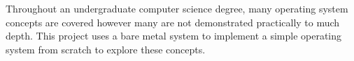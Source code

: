 
Throughout an undergraduate computer science degree, many operating system concepts are covered however many are not demonstrated practically to much depth. This project uses a bare metal system to implement a simple operating system from scratch to explore these concepts.